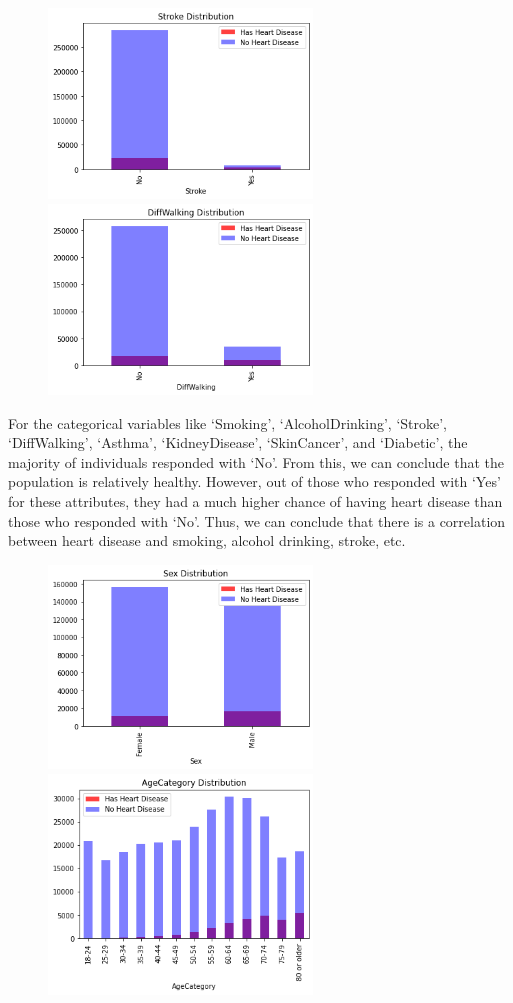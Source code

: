 \documentclass[a4paper]{article}
\begin{document}
\begin{figure}[H]
    \centering
    \includegraphics[width=7cm]{images/stroke.png}
    \includegraphics[width=7cm]{images/difficultywalking.png}
\end{figure}

For the categorical variables like ‘Smoking’, ‘AlcoholDrinking’, ‘Stroke’, ‘DiffWalking’, ‘Asthma’, ‘KidneyDisease’, ‘SkinCancer’, and ‘Diabetic’, the majority of individuals responded with ‘No’. From this, we can conclude that the population is relatively healthy. However, out of those who responded with ‘Yes’ for these attributes, they had a much higher chance of having heart disease than those who responded with ‘No’. Thus, we can conclude that there is a correlation between heart disease and smoking, alcohol drinking, stroke, etc.

\begin{figure}[H]
    \centering
    \includegraphics[width=7cm]{images/sex.png}
    \includegraphics[width=7cm]{images/agecategory.png}
\end{figure}
\end{document}
